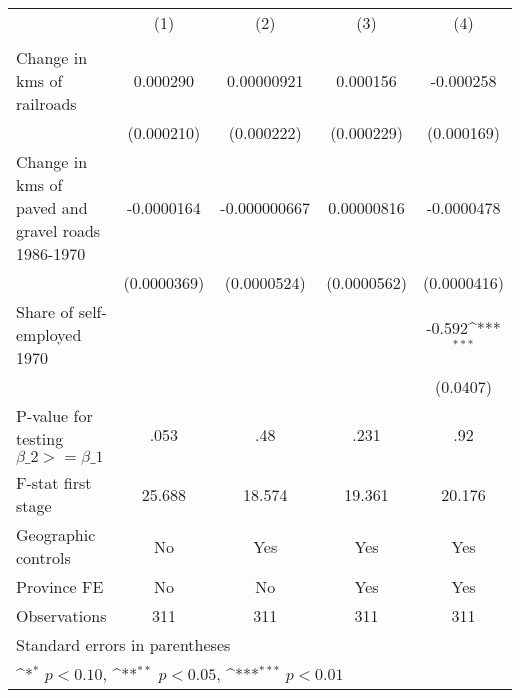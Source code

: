 {
\def\sym#1{\ifmmode^{#1}\else\(^{#1}\)\fi}
\begin{tabular}{l*{4}{c}}
\hline\hline
                &\multicolumn{1}{c}{(1)}&\multicolumn{1}{c}{(2)}&\multicolumn{1}{c}{(3)}&\multicolumn{1}{c}{(4)}\\
                &\multicolumn{1}{c}{}&\multicolumn{1}{c}{}&\multicolumn{1}{c}{}&\multicolumn{1}{c}{}\\
\hline
Change in kms of railroads& 0.000290         &0.00000921         & 0.000156         &-0.000258         \\
                &(0.000210)         &(0.000222)         &(0.000229)         &(0.000169)         \\
[1em]
Change in kms of paved and gravel roads 1986-1970&-0.0000164         &-0.000000667         &0.00000816         &-0.0000478         \\
                &(0.0000369)         &(0.0000524)         &(0.0000562)         &(0.0000416)         \\
[1em]
Share of self-employed 1970&                  &                  &                  &   -0.592\sym{***}\\
                &                  &                  &                  & (0.0407)         \\
\hline
P-value for testing $\beta\_{2} >= \beta\_{1}$&     .053         &      .48         &     .231         &      .92         \\
F-stat first stage&   25.688         &   18.574         &   19.361         &   20.176         \\
Geographic controls&       No         &      Yes         &      Yes         &      Yes         \\
Province FE     &       No         &       No         &      Yes         &      Yes         \\
Observations    &      311         &      311         &      311         &      311         \\
\hline\hline
\multicolumn{5}{l}{\footnotesize Standard errors in parentheses}\\
\multicolumn{5}{l}{\footnotesize \sym{*} \(p<0.10\), \sym{**} \(p<0.05\), \sym{***} \(p<0.01\)}\\
\end{tabular}
}
